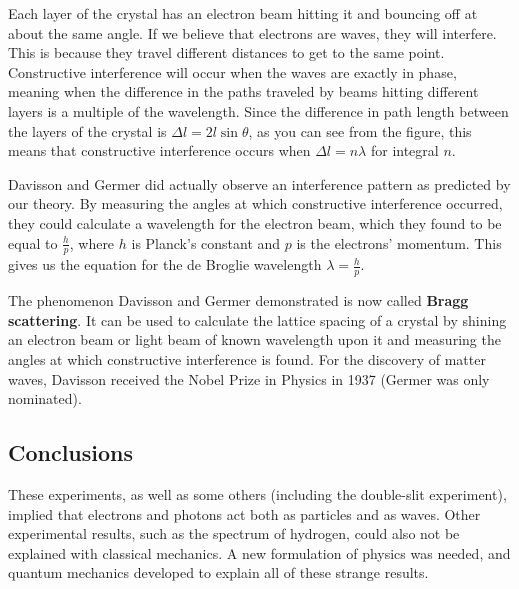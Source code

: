 Each layer of the crystal has an electron beam hitting it and bouncing off at about the same angle. If we believe that electrons are waves, they will interfere. This is because they travel different distances to get to the same point. Constructive interference will occur when the waves are exactly in phase, meaning when the difference in the paths traveled by beams hitting different layers is a multiple of the wavelength. Since the difference in path length between the layers of the crystal is $\Delta l =2l \sin \theta$, as you can see from the figure, this means that constructive interference occurs when $\Delta l = n \lambda$ for integral $n$. 

Davisson and Germer did actually observe an interference pattern as predicted by our theory. By measuring the angles at which constructive interference occurred, they could calculate a wavelength for the electron beam, which they found to be equal to $\tfrac{h}{p}$, where $h$ is Planck's constant and $p$ is the electrons' momentum. This gives us the equation for the de Broglie wavelength $\lambda = \tfrac{h}{p}$.

The phenomenon Davisson and Germer demonstrated is now called \textbf{Bragg scattering}. It can be used to calculate the lattice spacing of a crystal by shining an electron beam or light beam of known wavelength upon it and measuring the angles at which constructive interference is found. For the discovery of matter waves, Davisson received the Nobel Prize in Physics in 1937 (Germer was only nominated).

\subsection{Conclusions}
These experiments, as well as some others (including the double-slit experiment), implied that electrons and photons act both as particles and as waves. Other experimental results, such as the spectrum of hydrogen, could also not be explained with classical mechanics. A new formulation of physics was needed, and quantum mechanics developed to explain all of these strange results. 